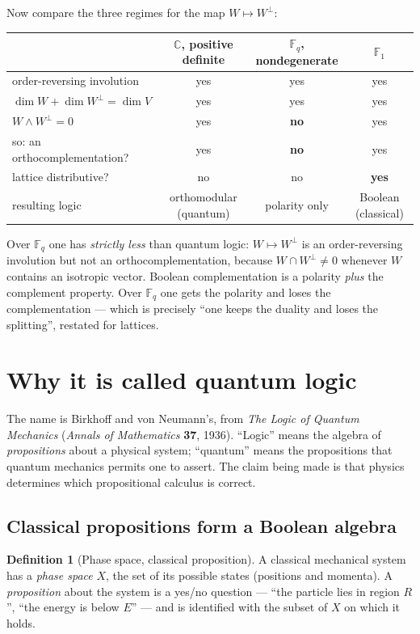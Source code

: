 \documentclass[11pt,a4paper]{article}
\theoremstyle{definition}
\newtheorem{definition}[theorem]{Definition}
\theoremstyle{remark}
\newcommand{\FF}{\mathbb{F}}
\newcommand{\CC}{\mathbb{C}}
\newcommand{\perpp}{^{\perp}}
\begin{document}
Now compare the three regimes for the map $W \mapsto W\perpp$:

\begin{center}
\small
\setlength{\tabcolsep}{4pt}
\begin{tabular}{lccc}
\toprule
 & $\CC$, positive definite & $\FF_q$, nondegenerate & $\FF_1$ \\
\midrule
order-reversing involution & yes & yes & yes \\
$\dim W + \dim W\perpp = \dim V$ & yes & yes & yes \\
$W \wedge W\perpp = 0$ & yes & \textbf{no} & yes \\
so: an orthocomplementation? & yes & \textbf{no} & yes \\
lattice distributive? & no & no & \textbf{yes} \\
resulting logic & orthomodular (quantum) & polarity only & Boolean (classical) \\
\bottomrule
\end{tabular}
\end{center}

Over $\FF_q$ one has \emph{strictly less} than quantum logic: $W \mapsto W\perpp$ is an
order-reversing involution but not an orthocomplementation, because $W \cap W\perpp \neq 0$
whenever $W$ contains an isotropic vector. Boolean complementation is a polarity \emph{plus}
the complement property. Over $\FF_q$ one gets the polarity and loses the complementation ---
which is precisely ``one keeps the duality and loses the splitting'', restated for lattices.

\section{Why it is called quantum logic}\label{sec:qlogic}

The name is Birkhoff and von Neumann's, from \emph{The Logic of Quantum Mechanics}
(\emph{Annals of Mathematics} \textbf{37}, 1936). ``Logic'' means the algebra of
\emph{propositions} about a physical system; ``quantum'' means the propositions that quantum
mechanics permits one to assert. The claim being made is that physics determines which
propositional calculus is correct.

\subsection{Classical propositions form a Boolean algebra}

\begin{definition}[Phase space, classical proposition]
A classical mechanical system has a \emph{phase space} $X$, the set of its possible states
(positions and momenta). A \emph{proposition} about the system is a yes/no question --- ``the
particle lies in region $R$'', ``the energy is below $E$'' --- and is identified with the
subset of $X$ on which it holds.
\end{definition}
\end{document}
